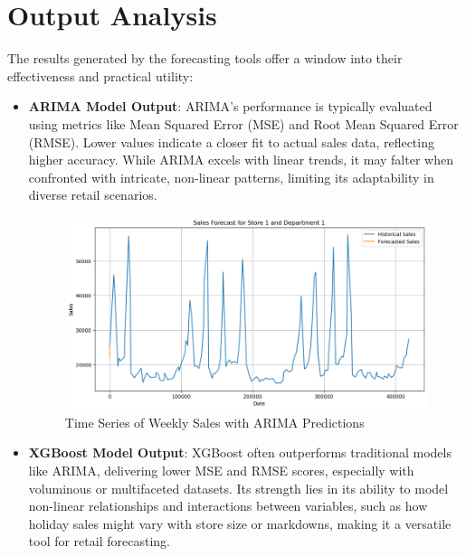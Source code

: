 \section{Output Analysis}
The results generated by the forecasting tools offer a window into their effectiveness and practical utility:
\begin{itemize}
    \item \textbf{ARIMA Model Output}: ARIMA’s performance is typically evaluated using metrics like Mean Squared Error (MSE) and Root Mean Squared Error (RMSE). Lower values indicate a closer fit to actual sales data, reflecting higher accuracy. While ARIMA excels with linear trends, it may falter when confronted with intricate, non-linear patterns, limiting its adaptability in diverse retail scenarios.
    \begin{figure}[h]
        \centering
        \includegraphics[width=0.8\linewidth]{./figures_adarsh/Sales_forecasting.png}
        \caption{Time Series of Weekly Sales with ARIMA Predictions}
        \label{fig:sales_over_time}
    \end{figure}
    
    \item \textbf{XGBoost Model Output}: XGBoost often outperforms traditional models like ARIMA, delivering lower MSE and RMSE scores, especially with voluminous or multifaceted datasets. Its strength lies in its ability to model non-linear relationships and interactions between variables, such as how holiday sales might vary with store size or markdowns, making it a versatile tool for retail forecasting.
    

\end{itemize}
